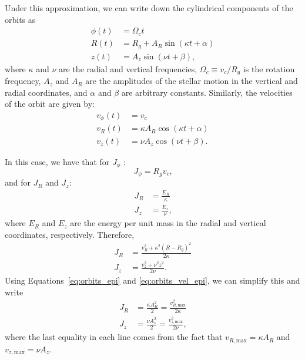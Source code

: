 \documentclass[twocolumn]{aastex62}
\newcommand{\beq}{\begin{equation}}
\newcommand{\eeq}{\end{equation}}
\begin{document}
Under this approximation, we can write down the cylindrical components
of the orbits as
\beq\label{eq:orbits_epi}
\begin{split}
\phi(t) &= \Omega_c t \\
R(t) &= R_g + A_R \sin{(\kappa t + \alpha)} \\
z(t) &= A_z \sin{(\nu t + \beta)}
\text{,}
\end{split}
\eeq
where $\kappa$ and $\nu$ are the radial and vertical frequencies, $\Omega_c
\equiv v_c/R_g$ is the rotation frequency, $A_z$ and $A_R$ are the amplitudes of
the stellar motion in the vertical and radial coordinates, and $\alpha$ and
$\beta$ are arbitrary constants. Similarly, the velocities of the orbit are
given by:
\beq\label{eq:orbits_vel_epi}
\begin{split}
v_{\phi}(t) &= v_c \\
v_R(t) &= \kappa A_R \cos{(\kappa t + \alpha)} \\
v_z(t) &= \nu A_z \cos{(\nu t + \beta)}
\text{.}
\end{split}
\eeq

In this case, we have that for $J_{\phi}$
\citep[][Section~3.5.3b]{2008gady.book.....B}:
\beq\label{eq:Jphi_epi}
J_{\phi} = R_g v_c\text{,}
\eeq
and for $J_R$ and $J_z$:
\beq\label{eq:JR_Jz_epi}
\begin{split}
J_R &= \frac{E_R}{\kappa} \\
J_z &= \frac{E_z}{\nu} \text{,}
\end{split}
\eeq
where $E_R$ and $E_z$ are the energy per unit mass in the radial and vertical
coordinates, respectively. Therefore,
\beq\label{eq:JR_Jz_epi_energy}
\begin{split}
J_R &= \frac{v_R^2 + \kappa^2 (R-R_g)^2}{2\kappa} \\
J_z &= \frac{v_z^2 + \nu^2 z^2}{2\nu}\text{.}
\end{split}
\eeq
Using Equations~\eqref{eq:orbits_epi} and \eqref{eq:orbits_vel_epi}, we can
simplify this and write
\beq\label{eq:JR_Jz_epi_final}
\begin{split}
J_R &= \frac{\kappa A_R^2}{2} = \frac{v_{R,\text{max}}^2}{2\kappa} \\
J_z &= \frac{\nu A_z^2}{2} = \frac{v_{z,\text{max}}^2}{2\nu}\text{,}
\end{split}
\eeq
where the last equality in each line comes from the fact that
$v_{R,\text{max}} = \kappa A_R$ and $v_{z,\text{max}} = \nu A_z$.
\end{document}
